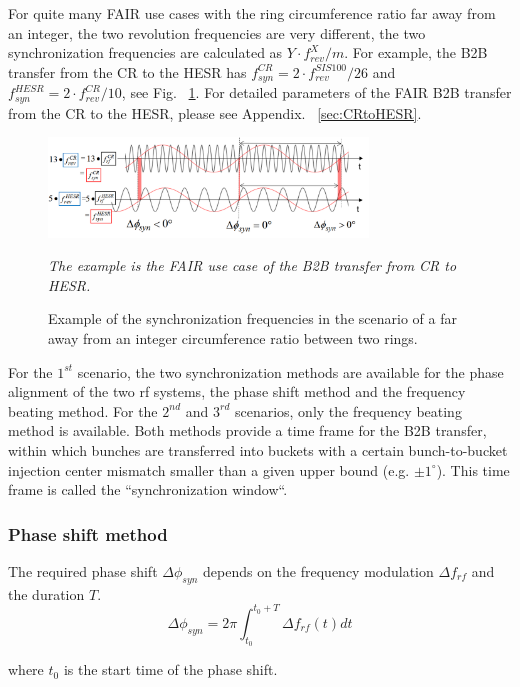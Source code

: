 For quite many FAIR use cases with the ring circumference ratio far away from an integer, the two revolution frequencies are very different, the two synchronization frequencies are calculated as $Y\cdot f_\mathit{rev}^{X}/m$. For example, the B2B transfer from the CR to the HESR has $f_{\mathit{syn}}^{CR}=2\cdot f_{\mathit{rev}}^{SIS100}/26$ and $f_{\mathit{syn}}^{HESR}=2\cdot f_{\mathit{rev}}^{CR}/10$, see Fig. ~\ref{CR-HESR}. For detailed parameters of the FAIR B2B transfer from the CR to the HESR, please see Appendix. ~\ref{sec:CRtoHESR}. 
\begin{figure}[!htb]
   \centering   
   \includegraphics*[width=85mm]{CR-HESR.png}
   \caption{Example of the synchronization frequencies in the scenario of a far away from an integer circumference ratio between two rings.}
{\textsl{\small{The example is the FAIR use case of the B2B transfer from CR to HESR.}}}
   \label{CR-HESR}
\end{figure} 

For the $1^{st}$ scenario, the two synchronization methods are available for the phase alignment of the two rf systems, the phase shift method and the frequency beating method. For the $2^{nd}$ and $3^{rd}$ scenarios, only the frequency beating method is available. Both methods provide a time frame for the B2B transfer, within which bunches are transferred into buckets with a certain bunch-to-bucket injection center mismatch smaller than a given upper bound (e.g. $\pm1^\circ$). This time frame is called the “synchronization window“. 

\subsubsection{Phase shift method}
The required phase shift $\Delta \phi_\mathit{syn}$ depends on the frequency modulation $\Delta f_\mathit{rf}$ and the duration $T$. 
\begin{equation}
\Delta \phi_\mathit{syn}= 2\pi \int_{t_0}^{t_0+T} \Delta f_\mathit{rf}(t)dt \label{phase1}
\end{equation}

where $t_0$ is the start time of the phase shift.

